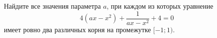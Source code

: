 \begin{ex}
	\begin{condition}
		Найдите все значения параметра \( a \), при каждом из которых уравнение \[ 4(ax-x^2)+\dfrac{1}{ax-x^2}+4=0 \] имеет ровно два различных корня на промежутке \( [-1;1) \).
	\end{condition}
	\answer{\( [-0,5;0,5) \)}
\end{ex}